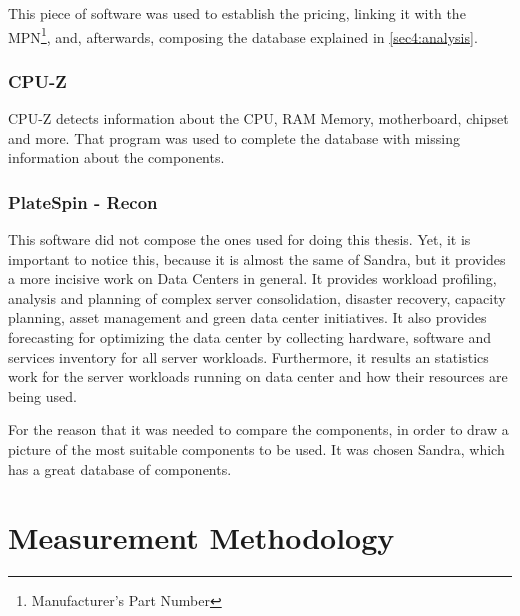     This piece of software was used to establish the pricing, linking it with the MPN\footnote{Manufacturer's Part Number}, and, afterwards, composing the database explained in \ref{sec4:analysis}. 

\subsubsection{CPU-Z} \label{sec3:cpu-z}
    CPU-Z detects information about the CPU, RAM Memory, motherboard, chipset and more. That program was used to complete the database with missing information about the components.

\subsubsection{PlateSpin - Recon} \label{sec3:power_recon}
    This software did not compose the ones used for doing this thesis. Yet, it is important to notice this, because it is almost the same of Sandra, but it provides a more incisive work on Data Centers in general. It provides workload profiling, analysis and planning of complex server consolidation, disaster recovery, capacity planning, asset management and green data center initiatives. It also provides forecasting for optimizing the data center by collecting hardware, software and services inventory for all server workloads. Furthermore, it results an statistics work for the server workloads running on data center and how their resources are being used.
    
    For the reason that it was needed to compare the components, in order to draw a picture of the most suitable components to be used. It was chosen Sandra, which has a great database of components.

\section{Measurement Methodology} \label{sec3:measurement_methodology}

